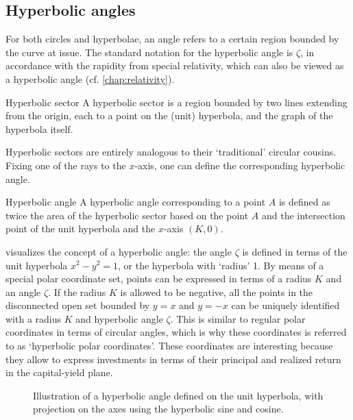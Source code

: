 \subsection{Hyperbolic angles}
For both circles and hyperbolae, an angle refers to a certain region bounded by the curve at issue. The standard notation for the hyperbolic angle is \(\zeta\), in accordance with the rapidity from special relativity, which can also be viewed as a hyperbolic angle (cf. \cref{chap:relativity}).
\begin{thmblock}{Hyperbolic sector}
A hyperbolic sector is a region bounded by two lines extending from the origin, each to a point on the (unit) hyperbola, and the graph of the hyperbola itself. 
\end{thmblock}
Hyperbolic sectors are entirely analogous to their `traditional' circular cousins. Fixing one of the rays to the \(x\)-axis, one can define the corresponding hyperbolic angle.
\begin{thmblock}{Hyperbolic angle}
A hyperbolic angle corresponding to a point \(A\) is defined as twice the area of the hyperbolic sector based on the point \(A\) and the intersection point of the unit hyperbola and the \(x\)-axis \((K, 0)\).
\end{thmblock}
 visualizes the concept of a hyperbolic angle: the angle $\zeta$ is defined in terms of the unit hyperbola $x^2 - y^2 = 1$, or the hyperbola with `radius' 1. 
By means of a special polar coordinate set, points can be expressed in terms of a radius $K$ and an angle $\zeta$. If the radius \(K\) is allowed to be negative, all the points in the disconnected open set bounded by \(y = x\) and \(y = -x\) can be uniquely identified with a radius \(K\) and hyperbolic angle \(\zeta\). This is similar to regular polar coordinates in terms of circular angles, which is why these coordinates is referred to as `hyperbolic polar coordinates'. These coordinates are interesting because they allow to express investments in terms of their principal and realized return in the capital-yield plane.

\begin{figure}[ht!]
    \centering
    
    \caption{Illustration of a hyperbolic angle defined on the unit hyperbola, with projection on the axes using the hyperbolic sine and cosine.}
    \label{fig:hyperbolic_angle}
\end{figure}

